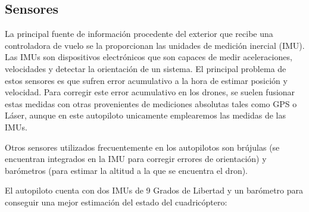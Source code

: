 \subsection{Sensores}
La principal fuente de información procedente del exterior que recibe una controladora de vuelo se la proporcionan las unidades de medición inercial (IMU). Las IMUs son dispositivos electrónicos que son capaces de medir aceleraciones, velocidades y detectar la orientación de un sistema. El principal problema de estos sensores es que sufren error acumulativo a la hora de estimar posición y velocidad. Para corregir este error acumulativo en los drones, se suelen fusionar estas medidas con otras provenientes de mediciones absolutas tales como GPS o Láser, aunque en este autopiloto unicamente emplearemos las medidas de las IMUs.

\par Otros sensores utilizados frecuentemente en los autopilotos son brújulas (se encuentran integrados en la IMU para corregir errores de orientación) y barómetros (para estimar la altitud a la que se encuentra el dron).\\
\medskip

El autopiloto cuenta con dos IMUs de 9 Grados de Libertad y un barómetro para conseguir una mejor estimación del estado del cuadricóptero:

